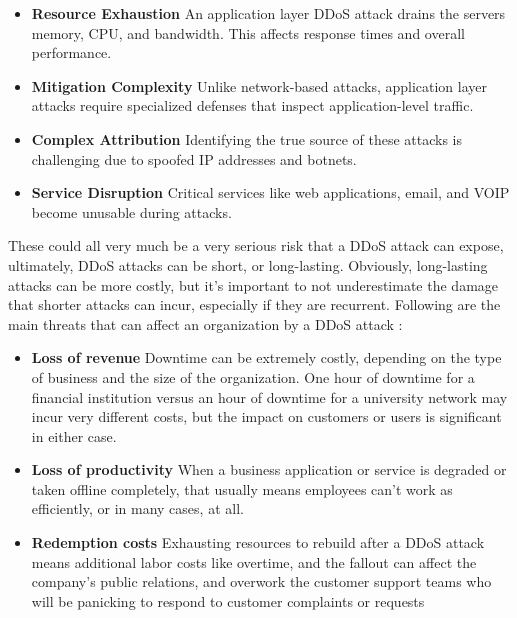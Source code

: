 \documentclass[a4paper, 12pt]{report} %
\begin{document}
\begin{table}[h!]
                \begin{itemize}
                    \item \textbf{Resource Exhaustion}  An application layer DDoS attack drains the servers memory, CPU, and bandwidth. This affects response times and overall performance.

                    \item \textbf{Mitigation Complexity} Unlike network-based attacks, application layer attacks require specialized defenses that inspect application-level traffic.

                    \item \textbf{Complex Attribution}  Identifying the true source of these attacks is challenging due to spoofed IP addresses and botnets.

                    \item \textbf{Service Disruption}  Critical services like web applications, email, and VOIP become unusable during attacks.

                \end{itemize}

                These could all very much be a very serious risk that a DDoS attack can expose, ultimately, DDoS attacks can be short, or long-lasting. Obviously, long-lasting attacks can be more costly, but it’s important to not underestimate the damage that shorter attacks can incur, especially if they are recurrent. Following are the main threats that can affect an organization by a DDoS attack \cite{corero}:

                \begin{itemize}
                    \item \textbf{Loss of revenue} Downtime can be extremely costly, depending on the type of business and the size of the organization. One hour of downtime for a financial institution versus an hour of downtime for a university network may incur very different costs, but the impact on customers or users is significant in either case. 

                    \item \textbf{Loss of productivity}  When a business application or service is degraded or taken offline completely, that usually means employees can’t work as efficiently, or in many cases, at all. 

                    \item \textbf{Redemption costs} Exhausting resources to rebuild after a DDoS attack means additional labor costs like overtime, and the fallout can affect the company’s public relations, and overwork the customer support teams who will be panicking to respond to customer complaints or requests



\end{itemize}
\end{table}
\end{document}
